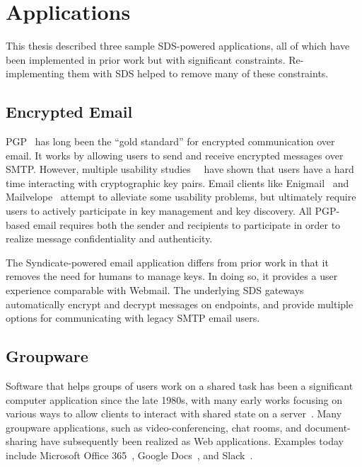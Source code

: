 \section{Applications}

This thesis described three sample SDS-powered applications, all of which have been
implemented in prior work but with significant constraints.  Re-implementing
them with SDS helped to remove many of these constraints.

\subsection{Encrypted Email}

PGP~\cite{pgp} has long been the ``gold standard'' for encrypted communication
over email.  It works by allowing users to send and receive encrypted messages
over SMTP.  However, multiple usability
studies~\cite{why-johnny-cant-encrypt}~\cite{why-johnny-still-still-cant-encrypt}
have shown that users have a hard time interacting with cryptographic key pairs.
Email clients like Enigmail~\cite{enigmail} and Mailvelope~\cite{mailvelope}
attempt to alleviate some usability problems, but ultimately require users to
actively participate in key management and key discovery.  All PGP-based email
requires both the sender and recipients to participate in order to realize
message confidentiality and authenticity.

The Syndicate-powered email application differs from prior work in that it removes the
need for humans to manage keys.  In doing so, it provides a user experience
comparable with Webmail.  The underlying SDS gateways automatically encrypt and
decrypt messages on endpoints, and provide multiple options for communicating
with legacy SMTP email users.

\subsection{Groupware}

Software that helps groups of users work on a shared task has been a significant
computer application since the late 1980s, with many early works focusing
on various ways to allow clients to interact with shared state on a server~\cite{readings-in-groupware}.
Many groupware applications, such as video-conferencing, chat rooms,
and document-sharing have subsequently been realized as Web applications.
Examples today include Microsoft Office 365~\cite{microsoft-apps}, Google
Docs~\cite{google-docs}, and Slack~\cite{slack}.

